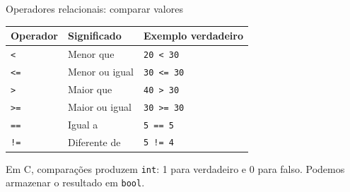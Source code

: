\begin{frame}{Operadores relacionais: comparar valores}
\begin{center}
\begin{tabular}{lll}
\toprule
Operador & Significado & Exemplo verdadeiro \\
\midrule
\texttt{<} & Menor que & \texttt{20 < 30} \\
\texttt{<=} & Menor ou igual & \texttt{30 <= 30} \\
\texttt{>} & Maior que & \texttt{40 > 30} \\
\texttt{>=} & Maior ou igual & \texttt{30 >= 30} \\
\texttt{==} & Igual a & \texttt{5 == 5} \\
\texttt{!=} & Diferente de & \texttt{5 != 4} \\
\bottomrule
\end{tabular}
\end{center}
Em C, comparações produzem \texttt{int}: 1 para verdadeiro e 0 para falso. Podemos armazenar o resultado em \texttt{bool}.
\end{frame}
